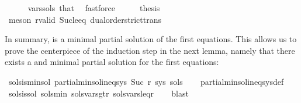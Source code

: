 \begin{isabellebody}
\ \ \ \ \isamarkupfalse%
\ vars{\isacharunderscore}{\kern0pt}sols\ that\ \isamarkupfalse%
\ fastforce\isanewline
\ \ \isamarkupfalse%
\ \isamarkupfalse%
\ {\isacharquery}{\kern0pt}thesis\ \isamarkupfalse%
\ {\isacharparenleft}{\kern0pt}meson\ r{\isacharunderscore}{\kern0pt}valid\ Suc{\isacharunderscore}{\kern0pt}le{\isacharunderscore}{\kern0pt}eq\ dual{\isacharunderscore}{\kern0pt}order{\isachardot}{\kern0pt}strict{\isacharunderscore}{\kern0pt}trans{}{\isacharparenright}{\kern0pt}\isanewline
{}\isamarkupfalse%
%
\endisatagproof
{\isafoldproof}%
%
\isadelimproof
%
\endisadelimproof
%
\begin{isamarkuptext}%
In summary,  is a minimal partial solution of the first  equations. This
allows us to prove the centerpiece of the induction step in the next lemma, namely that there exists
a  and minimal partial solution for the first  equations:%
\end{isamarkuptext}\isamarkuptrue%
\isamarkupfalse%
\ sols{\isacharprime}{\kern0pt}{\isacharunderscore}{\kern0pt}is{\isacharunderscore}{\kern0pt}min{\isacharunderscore}{\kern0pt}sol{\isacharcolon}{\kern0pt}\ {\isachardoublequoteopen}partial{\isacharunderscore}{\kern0pt}min{\isacharunderscore}{\kern0pt}sol{\isacharunderscore}{\kern0pt}ineq{\isacharunderscore}{\kern0pt}sys\ {\isacharparenleft}{\kern0pt}Suc\ r{\isacharparenright}{\kern0pt}\ sys\ sols{\isacharprime}{\kern0pt}{\isachardoublequoteclose}\isanewline
%
\isadelimproof
\ \ %
\endisadelimproof
%
\isatagproof
{}\isamarkupfalse%
\ partial{\isacharunderscore}{\kern0pt}min{\isacharunderscore}{\kern0pt}sol{\isacharunderscore}{\kern0pt}ineq{\isacharunderscore}{\kern0pt}sys{\isacharunderscore}{\kern0pt}def\isanewline
\ \ \isamarkupfalse%
\ sols{\isacharprime}{\kern0pt}{\isacharunderscore}{\kern0pt}is{\isacharunderscore}{\kern0pt}sol\ sols{\isacharprime}{\kern0pt}{\isacharunderscore}{\kern0pt}min\ sols{\isacharprime}{\kern0pt}{\isacharunderscore}{\kern0pt}vars{\isacharunderscore}{\kern0pt}gt{\isacharunderscore}{\kern0pt}r\ sols{\isacharprime}{\kern0pt}{\isacharunderscore}{\kern0pt}vars{\isacharunderscore}{\kern0pt}leq{\isacharunderscore}{\kern0pt}r\isanewline
\ \ \isamarkupfalse%
\ blast%
\endisatagproof
{\isafoldproof}%
%
\isadelimproof
\isanewline
%
\endisadelimproof
\isanewline

\end{isabellebody}
